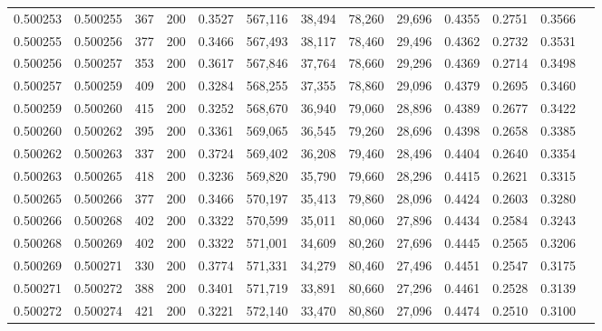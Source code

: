 \begin{tabular}{rrrrrrrrrrrrr}
0.500253 & 0.500255 &    367 & 200 &                                     0.3527 & 567,116 &  38,494 &  78,260 &  29,696 & 0.4355 & 0.2751 & 0.3566 \\
0.500255 & 0.500256 &    377 & 200 &                                     0.3466 & 567,493 &  38,117 &  78,460 &  29,496 & 0.4362 & 0.2732 & 0.3531 \\
0.500256 & 0.500257 &    353 & 200 &                                     0.3617 & 567,846 &  37,764 &  78,660 &  29,296 & 0.4369 & 0.2714 & 0.3498 \\
0.500257 & 0.500259 &    409 & 200 &                                     0.3284 & 568,255 &  37,355 &  78,860 &  29,096 & 0.4379 & 0.2695 & 0.3460 \\
0.500259 & 0.500260 &    415 & 200 &                                     0.3252 & 568,670 &  36,940 &  79,060 &  28,896 & 0.4389 & 0.2677 & 0.3422 \\
0.500260 & 0.500262 &    395 & 200 &                                     0.3361 & 569,065 &  36,545 &  79,260 &  28,696 & 0.4398 & 0.2658 & 0.3385 \\
0.500262 & 0.500263 &    337 & 200 &                                     0.3724 & 569,402 &  36,208 &  79,460 &  28,496 & 0.4404 & 0.2640 & 0.3354 \\
0.500263 & 0.500265 &    418 & 200 &                                     0.3236 & 569,820 &  35,790 &  79,660 &  28,296 & 0.4415 & 0.2621 & 0.3315 \\
0.500265 & 0.500266 &    377 & 200 &                                     0.3466 & 570,197 &  35,413 &  79,860 &  28,096 & 0.4424 & 0.2603 & 0.3280 \\
0.500266 & 0.500268 &    402 & 200 &                                     0.3322 & 570,599 &  35,011 &  80,060 &  27,896 & 0.4434 & 0.2584 & 0.3243 \\
0.500268 & 0.500269 &    402 & 200 &                                     0.3322 & 571,001 &  34,609 &  80,260 &  27,696 & 0.4445 & 0.2565 & 0.3206 \\
0.500269 & 0.500271 &    330 & 200 &                                     0.3774 & 571,331 &  34,279 &  80,460 &  27,496 & 0.4451 & 0.2547 & 0.3175 \\
0.500271 & 0.500272 &    388 & 200 &                                     0.3401 & 571,719 &  33,891 &  80,660 &  27,296 & 0.4461 & 0.2528 & 0.3139 \\
0.500272 & 0.500274 &    421 & 200 &                                     0.3221 & 572,140 &  33,470 &  80,860 &  27,096 & 0.4474 & 0.2510 & 0.3100 \\

\end{tabular}
